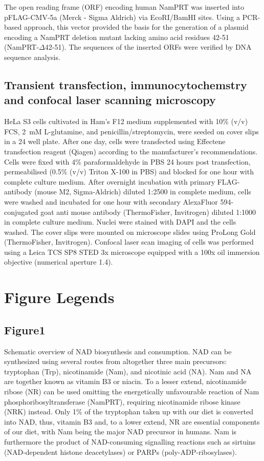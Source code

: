 \documentclass[paper=a4, 12pt]{scrartcl}
\begin{document}
The open reading frame (ORF) encoding human NamPRT was inserted into pFLAG-CMV-5a (Merck - Sigma Aldrich) via EcoRI/BamHI sites. Using a PCR-based approach, this vector provided the basis for the generation of a plasmid encoding a NamPRT deletion mutant lacking amino acid residues 42-51 (NamPRT-$\Delta$42-51). The sequences of the inserted ORFs were verified by DNA sequence analysis.


\subsection{Transient transfection, immunocytochemstry and confocal laser scanning microscopy}

HeLa S3 cells cultivated in Ham’s F12 medium supplemented with 10\% (v/v) FCS, 2 mM L-glutamine, and penicillin/streptomycin, were seeded on cover slips in a 24 well plate. After one day, cells were transfected using Effectene transfection reagent (Qiagen) according to the manufacturer’s recommendations. Cells were fixed with 4\% paraformaldehyde in PBS 24 hours post transfection, permeabilised (0.5\% (v/v) Triton X-100 in PBS) and blocked for one hour with complete culture medium. After overnight incubation with primary FLAG-antibody (mouse M2, Sigma-Aldrich) diluted 1:2500 in complete medium, cells were washed and incubated for one hour with secondary AlexaFluor 594-conjugated goat anti mouse antibody (ThermoFisher, Invitrogen) diluted 1:1000 in complete culture medium. Nuclei were stained with DAPI and the cells washed. The cover slips were mounted on microscope slides using ProLong Gold (ThermoFisher, Invitrogen). Confocal laser scan imaging of cells was performed using a Leica TCS SP8 STED 3x microscope equipped with a 100x oil immersion objective (numerical aperture 1.4).


\section{Figure Legends}

\subsection{Figure1}

Schematic overview of NAD biosynthesis and consumption. NAD can be synthesized using several routes from altogether three main precursors: tryptophan (Trp), nicotinamide (Nam), and nicotinic acid (NA). Nam and NA are together known as vitamin B3 or niacin. To a lesser extend, nicotinamide ribose (NR) can be used omitting the energetically unfavourable reaction of Nam phosphoribosyltransferase (NamPRT), requiring nicotinamide ribose kinase (NRK) instead. Only 1\% of the tryptophan taken up with our diet is converted into NAD, thus, vitamin B3 and, to a lower extend, NR are essential components of our diet, with Nam being the major NAD precursor in humans. Nam is furthermore the product of NAD-consuming signalling reactions such as sirtuins (NAD-dependent histone deacetylases) or PARPs (poly-ADP-ribosylases).
\end{document}
